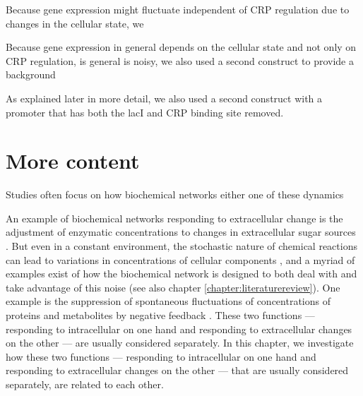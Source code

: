 
% 
Because gene expression might fluctuate independent of CRP regulation due to changes in the cellular state,
we 

Because gene expression in general depends on the cellular state and not only on CRP regulation, 
is general is noisy, we also used a second construct to provide a background 


%
As explained later in more detail, we also used a second construct with a promoter that has both the lacI and CRP binding site removed. 
%

























\section{More content}




Studies often focus on how biochemical networks either one of these dynamics

An example of biochemical networks responding to extracellular change is the adjustment of enzymatic concentrations to changes in extracellular sugar sources \cite{Towbin2017}.
But even in a constant environment, the stochastic nature of chemical reactions can lead to variations in concentrations of cellular components  \cite{Elowitz2002,Kiviet2014}, 
and a myriad of examples exist of how the biochemical network is designed to both deal with and take advantage of this noise (see also chapter \ref{chapter:literaturereview}).
One example is the suppression of spontaneous fluctuations of concentrations of proteins and metabolites by negative feedback \cite{Brandman2008, Lestas2010, Bowsher2013}.
These two functions --- responding to intracellular on one hand and responding to extracellular changes on the other --- are usually considered separately.
In this chapter, we investigate how these two functions --- responding to intracellular on one hand and responding to extracellular changes on the other --- that are usually considered separately, are related to each other.



